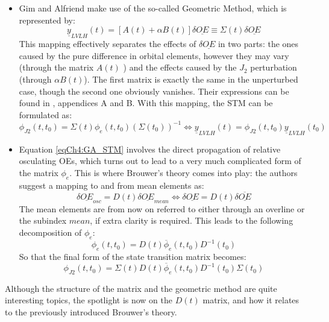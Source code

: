 	\begin{itemize}
	\item[\GMVred{\nth{1}}]  Gim and Alfriend make use of the so-called Geometric Method, which is represented by:
	\begin{equation}
	\underline{y}_{LVLH}(t) = \left[ A(t) + \alpha B(t) \right] \delta \underline{OE}  \equiv \Sigma(t) \delta \underline{OE} 
	\end{equation}
	\indent This mapping effectively separates the effects of $\delta \underline{OE} $ in two parts: the ones caused by the pure difference in orbital elements, however they may vary (through the matrix $A(t)$ ) and the effects caused by the $J_2$ perturbation (through $\alpha B(t)$). The first matrix is exactly the same in the unperturbed case, though the second one obviously vanishes. Their expressions can be found in \cite{GA_STM}, appendices A and B. With this mapping, the STM can be formulated as:
	\begin{equation}
	\phi_{J2} (t, t_0) = \Sigma(t) \phi_e(t, t_0) \left(\Sigma(t_0)\right)^{-1} \Longleftrightarrow \underline{y}_{LVLH}(t) = \phi_{J2} (t, t_0) \underline{y}_{LVLH}(t_0)
	\label{eqCh4:GA_STM}
	\end{equation}
	\item[\GMVred{\nth{2}}]  Equation \eqref{eqCh4:GA_STM} involves the direct propagation of relative osculating OEs, which turns out to lead to a very much complicated form of the matrix $\phi_e$. This is where Brouwer's theory comes into play: the authors suggest a mapping to and from mean elements as:
	\begin{equation}
	\delta \underline{OE}_{osc} = D(t) \delta \underline{OE}_{mean} \Leftrightarrow \delta \underline{OE} = D(t) \delta \underline{\overline{OE}}
	\end{equation}
	\indent The mean elements are from now on referred to either through an overline or the subindex $mean$, if extra clarity is required. This leads to the following decomposition of $\phi_e$:
	\begin{equation}
	\phi_e (t, t_0) = D(t) \overline{\phi}_e(t, t_0) D^{-1}(t_0)
	\end{equation}
	\indent So that the final form of the state transition matrix becomes:
	\begin{equation}
	\phi_{J2}(t, t_0) = \Sigma(t) D(t) \overline{\phi}_e(t, t_0) D^{-1}(t_0) \Sigma(t_0)
	\end{equation}
	\end{itemize}
	\indent Although the structure of the matrix and the geometric method are quite interesting topics, the spotlight is now on the $D(t)$ matrix, and how it relates to the previously introduced Brouwer's theory.
